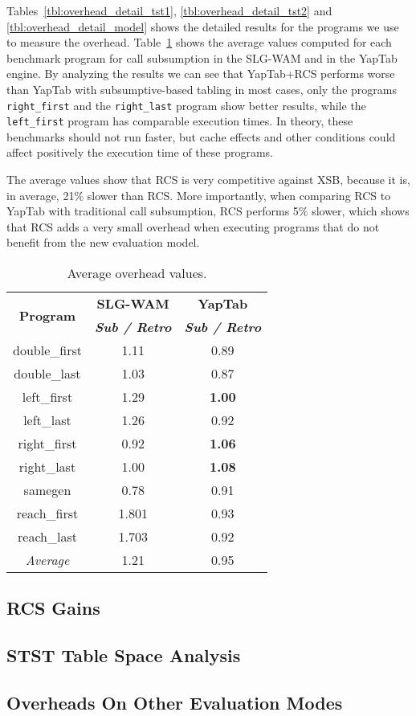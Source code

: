 Tables~\ref{tbl:overhead_detail_tst1}, \ref{tbl:overhead_detail_tst2} and \ref{tbl:overhead_detail_model}
shows the detailed results for the programs we use to measure the overhead.
Table~\ref{tbl:overhead_overview} shows the average values computed for each benchmark program
for call subsumption in the SLG-WAM and in the YapTab engine.
By analyzing the results we can see that YapTab+RCS performs worse
than YapTab with subsumptive-based tabling in most cases, only the
programs \texttt{right\_first} and the \texttt{right\_last} program show better results,
while the \texttt{left\_first} program has comparable execution times.
In theory, these benchmarks should not run faster, but cache effects and other
conditions could affect positively the execution time of these programs.

The average values show that
RCS is very competitive against XSB, because it is, in average, 21\% slower than RCS. More
importantly, when comparing RCS to YapTab with traditional call subsumption, RCS performs 5\% slower,
which shows that RCS adds a very small overhead when executing programs that do not benefit from the
new evaluation model.

\begin{table}[ht]
\centering
  \begin{tabular}{ccc}
   \hline
    \hline
    \multirow{2}{*}{\textbf{Program}} & \textbf{SLG-WAM} & \textbf{YapTab} \\
    & \textbf{\textit{\small{Sub / Retro}}} & \textbf{\textit{\small{Sub / Retro}}} \\
   \hline
   \hline
double\_first & 1.11 & 0.89 \\
double\_last & 1.03 & 0.87 \\
left\_first & 1.29 & \textbf{1.00} \\
left\_last &  1.26  & 0.92 \\
right\_first & 0.92 & \textbf{1.06} \\
right\_last & 1.00 & \textbf{1.08} \\
samegen & 0.78 & 0.91 \\
reach\_first  &  1.801  & 0.93 \\
reach\_last  &  1.703  & 0.92 \\
\hline
\hline
\textit{Average} &  1.21 &  0.95 \\
\hline
\hline
\end{tabular}
\caption{Average overhead values.}
\label{tbl:overhead_overview}
\end{table}




\subsection{RCS Gains}

\subsection{STST Table Space Analysis}

\subsection{Overheads On Other Evaluation Modes}

